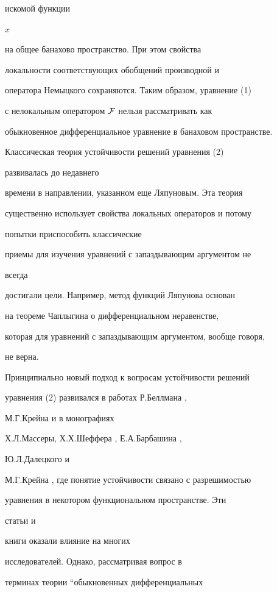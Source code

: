 искомой функции


$x$


на общее банахово пространство. При этом свойства


локальности соответствующих обобщений производной и


оператора Немыцкого сохраняются. Таким образом, уравнение (1)


с нелокальным оператором $\cal F$ нельзя рассматривать как


обыкновенное дифференциальное уравнение в банаховом пространстве.





Классическая теория устойчивости решений уравнения (2)


развивалась до недавнего


времени в направлении, указанном еще Ляпуновым. Эта теория


существенно использует свойства локальных операторов и потому


попытки приспособить классические


приемы для изучения уравнений с запаздывающим аргументом не


всегда


достигали цели. Например, метод функций Ляпунова основан


на теореме Чаплыгина о дифференциальном неравенстве,


которая для уравнений с запаздывающим аргументом, вообще говоря,


не верна.





Принципиально новый подход к вопросам устойчивости решений


уравнения (2) развивался в работах Р.Беллмана \cite{Bell},


М.Г.Крейна \cite{Kre} и в монографиях


Х.Л.Массеры, Х.Х.Шеффера \cite{Mass}, Е.А.Барбашина \cite{Bar},


Ю.Л.Далецкого и


М.Г.Крейна \cite{Dal}, где понятие устойчивости связано с разрешимостью


уравнения в некотором функциональном пространстве. Эти


статьи и


книги оказали влияние на многих


исследователей. Однако, рассматривая вопрос в


терминах теории ``обыкновенных дифференциальных


